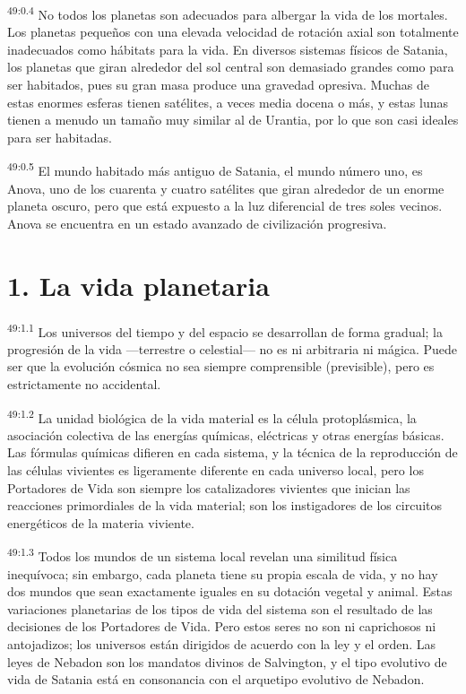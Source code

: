\par
\textsuperscript{49:0.4} No todos los planetas son adecuados para albergar la vida de los mortales. Los planetas pequeños con una elevada velocidad de rotación axial son totalmente inadecuados como hábitats para la vida. En diversos sistemas físicos de Satania, los planetas que giran alrededor del sol central son demasiado grandes como para ser habitados, pues su gran masa produce una gravedad opresiva. Muchas de estas enormes esferas tienen satélites, a veces media docena o más, y estas lunas tienen a menudo un tamaño muy similar al de Urantia, por lo que son casi ideales para ser habitadas.

\par
\textsuperscript{49:0.5} El mundo habitado más antiguo de Satania, el mundo número uno, es Anova, uno de los cuarenta y cuatro satélites que giran alrededor de un enorme planeta oscuro, pero que está expuesto a la luz diferencial de tres soles vecinos. Anova se encuentra en un estado avanzado de civilización progresiva.

\section*{1. La vida planetaria}
\par
\textsuperscript{49:1.1} Los universos del tiempo y del espacio se desarrollan de forma gradual; la progresión de la vida ---terrestre o celestial--- no es ni arbitraria ni mágica. Puede ser que la evolución cósmica no sea siempre comprensible (previsible), pero es estrictamente no accidental.

\par
\textsuperscript{49:1.2} La unidad biológica de la vida material es la célula protoplásmica, la asociación colectiva de las energías químicas, eléctricas y otras energías básicas. Las fórmulas químicas difieren en cada sistema, y la técnica de la reproducción de las células vivientes es ligeramente diferente en cada universo local, pero los Portadores de Vida son siempre los catalizadores vivientes que inician las reacciones primordiales de la vida material; son los instigadores de los circuitos energéticos de la materia viviente.

\par
\textsuperscript{49:1.3} Todos los mundos de un sistema local revelan una similitud física inequívoca; sin embargo, cada planeta tiene su propia escala de vida, y no hay dos mundos que sean exactamente iguales en su dotación vegetal y animal. Estas variaciones planetarias de los tipos de vida del sistema son el resultado de las decisiones de los Portadores de Vida. Pero estos seres no son ni caprichosos ni antojadizos; los universos están dirigidos de acuerdo con la ley y el orden. Las leyes de Nebadon son los mandatos divinos de Salvington, y el tipo evolutivo de vida de Satania está en consonancia con el arquetipo evolutivo de Nebadon.

